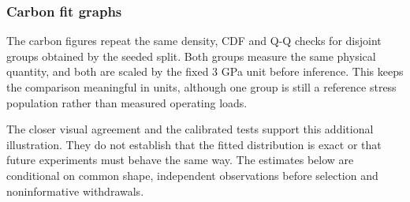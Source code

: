 \subsubsection{Carbon fit graphs}
The carbon figures repeat the same density, CDF and Q-Q checks for disjoint groups obtained by the seeded split. Both groups measure the same physical quantity, and both are scaled by the fixed 3 GPa unit before inference. This keeps the comparison meaningful in units, although one group is still a reference stress population rather than measured operating loads.

The closer visual agreement and the calibrated tests support this additional illustration. They do not establish that the fitted distribution is exact or that future experiments must behave the same way. The estimates below are conditional on common shape, independent observations before selection and noninformative withdrawals.


\FloatBarrier
